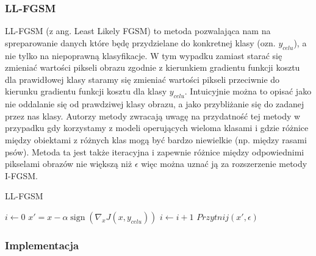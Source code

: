 \documentclass{article}
\begin{document}
    \subsubsection{LL-FGSM}
    LL-FGSM (z ang. Least Likely FGSM) to metoda pozwalająca nam na spreparowanie danych które będę przydzielane do
    konkretnej klasy (ozn. $y_{celu}$), a nie tylko na niepoprawną klasyfikacje. W tym wypadku zamiast starać się
    zmieniać wartości pikseli obrazu zgodnie z kierunkiem gradientu funkcji kosztu dla prawidłowej klasy
    staramy się zmieniać wartości pikseli przeciwnie do kierunku gradientu funkcji kosztu dla klasy $y_{celu}$.
    Intuicyjnie można to opisać jako nie oddalanie się od prawdziwej klasy obrazu, a jako przybliżanie się do zadanej
    przez nas klasy.
    Autorzy metody zwracają uwagę na przydatność tej metody
    w przypadku gdy korzystamy z modeli operujących wieloma klasami i gdzie różnice między obiektami z różnych klas mogą
    być bardzo niewielkie (np. między rasami psów). Metoda ta jest także iteracyjna i zapewnie różnice między
    odpowiednimi pikselami obrazów nie większą niż $\epsilon$ więc można uznać ją za rozszerzenie metody I-FGSM.

    \begin{algorithm}
    \caption{LL-FGSM}\label{LLFGSM}
    \begin{algorithmic}[1]
    \State $i \gets 0$
        \State $x' = x - \alpha\operatorname{sign}(\nabla_{x} J(x, y_{celu}))$
        \State $i \gets i+1$
        \State $Przytnij(x', \epsilon)$
    \EndWhile
    \end{algorithmic}
    \end{algorithm}

\subsubsection{Implementacja}
\end{document}
